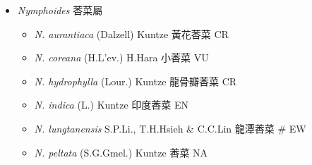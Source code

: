 
  \begin{itemize}
 \item[] \textit{Nymphoides} 莕菜屬
                                
  \begin{itemize}
        \item[] \textit{N. aurantiaca} (Dalzell) Kuntze  黃花莕菜   CR
        \item[] \textit{N. coreana} (H.L'ev.) H.Hara  小莕菜   VU
        \item[] \textit{N. hydrophylla} (Lour.) Kuntze  龍骨瓣莕菜   CR
        \item[] \textit{N. indica} (L.) Kuntze  印度莕菜   EN
        \item[] \textit{N. lungtanensis} S.P.Li., T.H.Hsieh \& C.C.Lin  龍潭莕菜  \# EW
        \item[] \textit{N. peltata} (S.G.Gmel.) Kuntze  莕菜   NA
  \end{itemize}
  \end{itemize}
